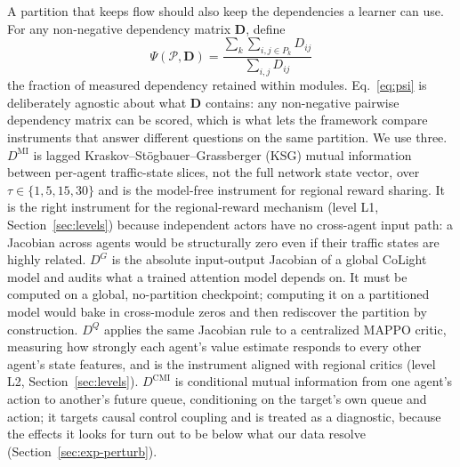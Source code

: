 \documentclass[journal]{IEEEtran}
\theoremstyle{definition}
\begin{document}
A partition that keeps flow should also keep the dependencies a learner can use.
For any non-negative dependency matrix $\mathbf{D}$, define
\begin{equation}
    \Psi(\mathcal{P},\mathbf{D})
    =
    \frac{\sum_k\sum_{i,j\in P_k} D_{ij}}
    {\sum_{i,j}D_{ij}}
    \label{eq:psi}
\end{equation}
the fraction of measured dependency retained within modules. Eq.~\eqref{eq:psi} is deliberately agnostic about what $\mathbf{D}$ contains: any non-negative pairwise dependency matrix can be scored, which is what lets the framework compare instruments that answer different questions on the same partition. We use three. $D^{\mathrm{MI}}$ is lagged Kraskov--St\"ogbauer--Grassberger (KSG) mutual information~\citep{kraskov2004ksg} between per-agent traffic-state slices, not the full network state vector, over $\tau\in\{1,5,15,30\}$ and is the model-free instrument for regional reward sharing. It is the right instrument for the regional-reward mechanism (level L1, Section~\ref{sec:levels}) because independent actors have no cross-agent input path: a Jacobian across agents would be structurally zero even if their traffic states are highly related. $D^{G}$ is the absolute input-output Jacobian of a global CoLight model and audits what a trained attention model depends on. It must be computed on a global, no-partition checkpoint; computing it on a partitioned model would bake in cross-module zeros and then rediscover the partition by construction. $D^{Q}$ applies the same Jacobian rule to a centralized MAPPO critic, measuring how strongly each agent's value estimate responds to every other agent's state features, and is the instrument aligned with regional critics (level L2, Section~\ref{sec:levels}). $D^{\mathrm{CMI}}$ is conditional mutual information from one agent's action to another's future queue, conditioning on the target's own queue and action; it targets causal control coupling and is treated as a diagnostic, because the effects it looks for turn out to be below what our data resolve (Section~\ref{sec:exp-perturb}).
\end{document}
